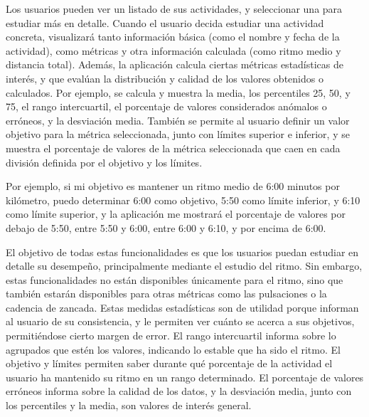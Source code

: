 Los usuarios pueden ver un listado de sus actividades, y seleccionar una para estudiar más en detalle. Cuando el usuario decida estudiar una actividad concreta, visualizará tanto información básica (como el nombre y fecha de la actividad), como métricas y otra información calculada (como ritmo medio y distancia total). Además, la aplicación calcula ciertas métricas estadísticas de interés, y que evalúan la distribución y calidad de los valores obtenidos o calculados. Por ejemplo, se calcula y muestra la media, los percentiles 25, 50, y 75, el rango intercuartil, el porcentaje de valores considerados anómalos o erróneos, y la desviación media. También se permite al usuario definir un valor objetivo para la métrica seleccionada, junto con límites superior e inferior, y se muestra el porcentaje de valores de la métrica seleccionada que caen en cada división definida por el objetivo y los límites.

Por ejemplo, si mi objetivo es mantener un ritmo medio de 6:00 minutos por kilómetro, puedo determinar 6:00 como objetivo, 5:50 como límite inferior, y 6:10 como límite superior, y la aplicación me mostrará el porcentaje de valores por debajo de 5:50, entre 5:50 y 6:00, entre 6:00 y 6:10, y por encima de 6:00.

El objetivo de todas estas funcionalidades es que los usuarios puedan estudiar en detalle su desempeño, principalmente mediante el estudio del ritmo. Sin embargo, estas funcionalidades no están disponibles únicamente para el ritmo, sino que también estarán disponibles para otras métricas como las pulsaciones o la cadencia de zancada. Estas medidas estadísticas son de utilidad porque informan al usuario de su consistencia, y le permiten ver cuánto se acerca a sus objetivos, permitiéndose cierto margen de error. El rango intercuartil informa sobre lo agrupados que estén los valores, indicando lo estable que ha sido el ritmo. El objetivo y límites permiten saber durante qué porcentaje de la actividad el usuario ha mantenido su ritmo en un rango determinado. El porcentaje de valores erróneos informa sobre la calidad de los datos, y la desviación media, junto con los percentiles y la media, son valores de interés general. 

